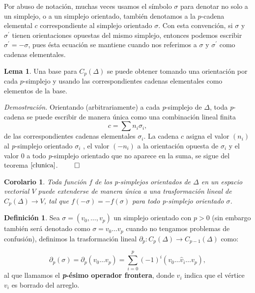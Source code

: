 \documentclass[12pt]{book}
\newtheorem{corollary}[theorem]{Corolario}
\theoremstyle{definition}
\newtheorem{definition}[theorem]{Definición}
\newtheorem{lemma}[theorem]{Lema}
\newcounter{in}
\newcounter{ini}
\begin{document}
Por abuso de notación, muchas veces usamos el símbolo $\sigma$ para
denotar no solo a un simplejo, o a un simplejo orientado, también
denotamos a la $p$-cadena elemental $c$ correspondiente al simplejo
orientado $\sigma$. Con esta convención, si $\sigma$ y $\sigma^{'}$
tienen orientaciones opuestas del mismo simplejo, entonces podemos
escribir $\sigma^{'}=-\sigma$, pues ésta ecuación se mantiene cuando
nos referimos a $\sigma$ y $\sigma^{'}$ como cadenas elementales.

\begin{lemma}
   Una base para $C_{p}(\Delta)$ se puede obtener
   tomando una orientación por cada $p$-simplejo y usando las
   correspondientes cadenas elementales como elementos de la base.
\end{lemma}

\textit{Demostración.} Orientando (arbitrariamente) a cada
\emph{p}-simplejo de $\Delta$, toda \emph{p}-cadena se puede escribir
de manera única como una combinación lineal finita
$$c=\sum n_{i}\sigma_{i},$$
de las correspondientes cadenas elementales $\sigma_{i}$. La
cadena $c$ asigna el valor $(n_{i})$ al \emph{p}-simplejo orientado
$\sigma_{i}$ , el valor $(-n_{i})$ a la orientación opuesta de
$\sigma_{i}$ y el valor $0$ a todo \emph{p}-simplejo orientado que no
aparece en la suma, se sigue del teorema $\ref{clunica}$. $\qed$

\begin{corollary}
  Toda función $f$ de los p-simplejos orientados de $\Delta$ en
  un espacio vectorial $V$ puede extenderse de manera única a una
  trasformación lineal de $C_{p}(\Delta)\rightarrow V$, tal que $f(-
  \sigma)=-f(\sigma)$ para todo p-simplejo orientado $\sigma$.
\end{corollary}

\begin{definition}
  Sea $\sigma=(v_{0},\ldots ,v_{p})$ un simplejo orientado con $p>0$
  (sin embargo también será denotado como $\sigma=v_{0}\ldots v_{p}$
  cuando no tengamos problemas de confusión),
  definimos la trasformación lineal $\partial_{p}:C_{p}(\Delta)\rightarrow
  C_{p-1}(\Delta)$ como:

  \begin{equation}
    \label{ofrontera}
    \partial_{p}(\sigma)=\partial_{p}(v_{0}\ldots
    v_{p})=\sum^{p}_{i=0}(-1)^{i}(v_{0}\ldots \widehat v_{i}\ldots v_{p}),
  \end{equation}
  al que llamamos el \textbf{\emph{p}-ésimo operador frontera}, donde
  $\widehat v_{i}$ indica que el vértice $v_{i}$ es borrado del arreglo.
\end{definition}
\end{document}
